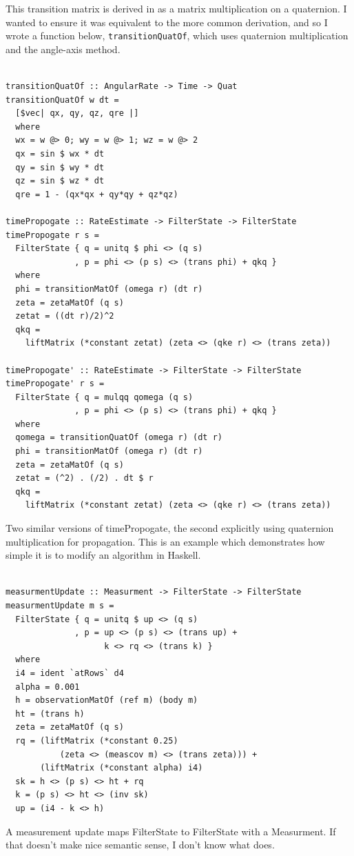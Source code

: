 \documentclass[12pt]{report}
\begin{document}
This transition matrix is derived in \cite{choukroun04} as a matrix multiplication on a quaternion. I wanted to ensure it was equivalent to the more common derivation, and so I wrote a function below, \lstinline$transitionQuatOf$, which uses quaternion multiplication and the angle-axis method.

\begin{lstlisting}

transitionQuatOf :: AngularRate -> Time -> Quat
transitionQuatOf w dt = 
  [$vec| qx, qy, qz, qre |]
  where
  wx = w @> 0; wy = w @> 1; wz = w @> 2
  qx = sin $ wx * dt
  qy = sin $ wy * dt
  qz = sin $ wz * dt
  qre = 1 - (qx*qx + qy*qy + qz*qz)

timePropogate :: RateEstimate -> FilterState -> FilterState
timePropogate r s = 
  FilterState { q = unitq $ phi <> (q s)
              , p = phi <> (p s) <> (trans phi) + qkq }
  where 
  phi = transitionMatOf (omega r) (dt r)
  zeta = zetaMatOf (q s)
  zetat = ((dt r)/2)^2
  qkq = 
    liftMatrix (*constant zetat) (zeta <> (qke r) <> (trans zeta))

timePropogate' :: RateEstimate -> FilterState -> FilterState
timePropogate' r s = 
  FilterState { q = mulqq qomega (q s)
              , p = phi <> (p s) <> (trans phi) + qkq }
  where 
  qomega = transitionQuatOf (omega r) (dt r)
  phi = transitionMatOf (omega r) (dt r)
  zeta = zetaMatOf (q s)
  zetat = (^2) . (/2) . dt $ r
  qkq = 
    liftMatrix (*constant zetat) (zeta <> (qke r) <> (trans zeta))  

\end{lstlisting}
Two similar versions of timePropogate, the second explicitly using quaternion multiplication for propagation. This is an example which demonstrates how simple it is to modify an algorithm in Haskell.

\begin{lstlisting}

measurmentUpdate :: Measurment -> FilterState -> FilterState
measurmentUpdate m s = 
  FilterState { q = unitq $ up <> (q s)
              , p = up <> (p s) <> (trans up) +
                    k <> rq <> (trans k) }
  where 
  i4 = ident `atRows` d4
  alpha = 0.001
  h = observationMatOf (ref m) (body m)
  ht = (trans h)
  zeta = zetaMatOf (q s)
  rq = (liftMatrix (*constant 0.25) 
           (zeta <> (meascov m) <> (trans zeta))) + 
       (liftMatrix (*constant alpha) i4)
  sk = h <> (p s) <> ht + rq 
  k = (p s) <> ht <> (inv sk)  
  up = (i4 - k <> h)

\end{lstlisting}
A measurement update maps FilterState to FilterState with a Measurment. If that doesn't make nice semantic sense, I don't know what does. 
\end{document}
